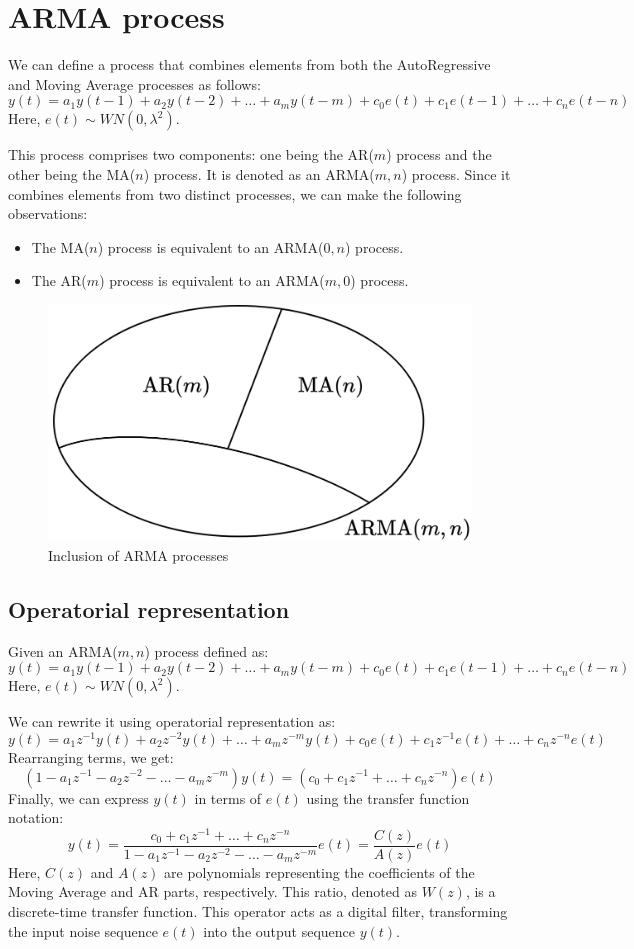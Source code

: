 \section{ARMA process}

We can define a process that combines elements from both the AutoRegressive and Moving Average processes as follows:
\[y(t)=a_1y(t-1)+a_2y(t-2)+\dots+a_m y(t-m)+c_0e(t)+c_1e(t-1)+\dots+c_n e(t-n) \]
Here, $e(t)\sim WN(0,\lambda^2)$.

This process comprises two components: one being the AR($m$) process and the other being the MA($n$) process. 
It is denoted as an ARMA($m,n$) process.
Since it combines elements from two distinct processes, we can make the following observations:
\begin{itemize}
    \item The MA($n$) process is equivalent to an ARMA($0,n$) process.
    \item The AR($m$) process is equivalent to an ARMA($m,0$) process. 
\end{itemize}
\begin{figure}[H]
    \centering
    \includegraphics[width=0.45\linewidth]{images/set.png}
    \caption{Inclusion of ARMA processes}
\end{figure}

\subsection{Operatorial representation}
Given an ARMA($m,n$) process defined as:
\[y(t)=a_1y(t-1)+a_2y(t-2)+\dots+a_m y(t-m)+c_0e(t)+c_1e(t-1)+\dots+c_n e(t-n)\]
Here, $e(t)\sim WN(0,\lambda^2)$.

We can rewrite it using operatorial representation as:
\[y(t)=a_1z^{-1}y(t)+a_2z^{-2}y(t)+\dots+a_m z^{-m}y(t)+c_0e(t)+c_1z^{-1}e(t)+\dots+c_n z^{-n}e(t)\]
Rearranging terms, we get:
\[\left(1- a_1z^{-1}-a_2z^{-2}-\dots-a_m z^{-m}\right)y(t)=\left(c_0+c_1z^{-1}+\dots+c_n z^{-n}\right)e(t)\]
Finally, we can express $y(t)$ in terms of $e(t)$ using the transfer function notation:
\[y(t)=\dfrac{c_0+c_1z^{-1}+\dots+c_n z^{-n}}{1- a_1z^{-1}-a_2z^{-2}-\dots-a_m z^{-m}}e(t)=\dfrac{C(z)}{A(z)}e(t)\]
Here, $C(z)$ and $A(z)$ are polynomials representing the coefficients of the Moving Average and AR parts, respectively. 
This ratio, denoted as $W(z)$, is a discrete-time transfer function. 
This operator acts as a digital filter, transforming the input noise sequence $e(t)$ into the output sequence $y(t)$.

